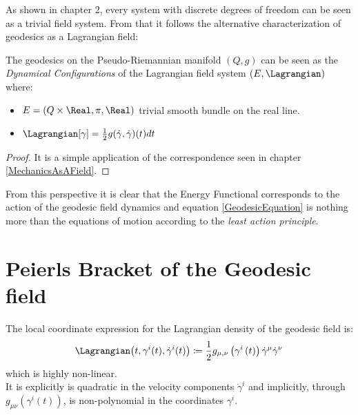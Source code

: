 \documentclass[Main]{subfiles}
\begin{document}
	As shown in chapter 2, every system with discrete degrees of freedom can be seen as a trivial field system.
	From that it follows the alternative characterization of geodesics as a Lagrangian field:
	\begin{corollary}
		The geodesics on the Pseudo-Riemannian manifold $(Q,g)$ can be seen as the \emph{Dynamical Configurations} of the Lagrangian field system $(E,\Lagrangian)$ where:
		\begin{itemize}
			\item $E=(Q\times\Real, \pi, \Real)$ trivial smooth bundle on the real line.
			\item $\Lagrangian[\gamma] = \frac{1}{2} g(\dot{\gamma},\dot{\gamma})(t) dt$
		\end{itemize}
	\end{corollary}
	\begin{proof}
		It is a simple application of the correspondence seen in chapter \ref{MechanicsAsAField}.
	\end{proof}
	
	From this perspective it is clear that the Energy Functional corresponds to the action of the geodesic field dynamics and equation \ref{GeodesicEquation} is nothing more than the equations of motion according to the \emph{least action principle}.



\section{Peierls Bracket of the Geodesic field}
	The local coordinate expression for the Lagrangian density of the geodesic field is:
	\begin{equation}
		\Lagrangian\big(t,\gamma^i(t), \dot{\gamma}^i(t) \big)\coloneqq \frac{1}{2}g_{\mu,\nu}\left(\gamma^i\left(t\right)\right)\dot{\gamma}^\mu \dot{\gamma}^\nu
	\end{equation}		
	which is highly non-linear. \\
	It is explicitly is quadratic in the velocity components $\dot{\gamma}^i$ and implicitly, through $g_{\mu\nu}(\gamma^i(t))$, is non-polynomial in the %
	coordinates $\gamma^i$.
	
\end{document}
